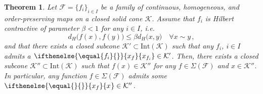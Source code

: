 \documentclass{article}
\newtheorem{theorem}{Theorem}[section]
\newcommand{\family}{\mathcal{F}}
\newcommand{\cone}{\mathcal{K}}
\newcommand{\interior}{\mathrm{Int}}
\newcommand{\dist}{d_H}
\newcommand{\ceigenvector}[1][]{
  \ifthenelse{\equal{#1}{}}
  {{x_f}}
  {{x}_{#1}}}
\begin{document}
%
%
%
\begin{theorem}\label{Thm_conctractivity_yields_invariant_subcone}
Let $\family=\{f_i\}_{i\in I}$ be a family of continuous, homogeneous, and order-preserving maps on a closed solid cone $\cone$.
%
Assume that $f_i$ is Hilbert contractive of parameter $\beta<1$ for any $i\in I$, i.e.
\begin{equation}
    \dist\big(f(x),f(y)\big)\leq \beta \dist\big(x,y\big) \quad \forall x\sim y\,,
\end{equation}
and that there exists a closed subcone $\cone'\subset \interior(\cone)$ such that any $f_i$, $i\in I$ admits a $\ceigenvector[f_i]\in \cone'$. Then, there exists a closed subcone $\cone'' \subset \interior(\cone)$ such that $f(x)\in \cone''$ for any $f\in \Sigma(\family)$ and $x\in \cone''$. In particular, any function $f\in \Sigma(\family)$ admits some $\ceigenvector\in \cone''$.
\end{theorem}
\end{document}
